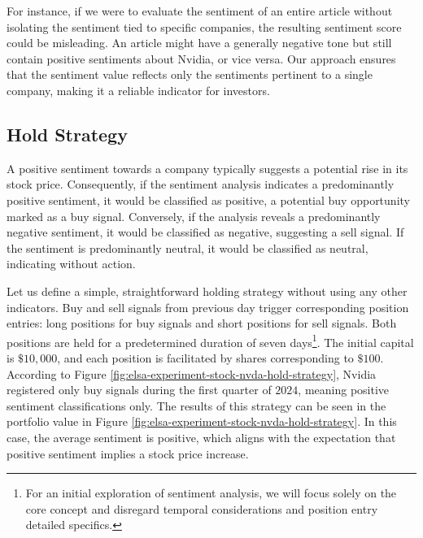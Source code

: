For instance, if we were to evaluate the sentiment of an entire article without isolating the sentiment tied to specific companies, the resulting sentiment score could be misleading. An article might have a generally negative tone but still contain positive sentiments about Nvidia, or vice versa. Our approach ensures that the sentiment value reflects only the sentiments pertinent to a single company, making it a reliable indicator for investors.

\subsection{Hold Strategy}
\label{subsec:elsa-hold-strategy}
A positive sentiment towards a company typically suggests a potential rise in its stock price. Consequently, if the sentiment analysis indicates a predominantly positive sentiment, it would be classified as positive, a potential buy opportunity marked as a buy signal. Conversely, if the analysis reveals a predominantly negative sentiment, it would be classified as negative, suggesting a sell signal. If the sentiment is predominantly neutral, it would be classified as neutral, indicating without action.

Let us define a simple, straightforward holding strategy without using any other indicators. Buy and sell signals from previous day trigger corresponding position entries: long positions for buy signals and short positions for sell signals. Both positions are held for a predetermined duration of seven days\footnote{For an initial exploration of sentiment analysis, we will focus solely on the core concept and disregard temporal considerations and position entry detailed specifics.}. The initial capital is $\$10,000$, and each position is facilitated by shares corresponding to $\$100$. According to Figure \ref{fig:elsa-experiment-stock-nvda-hold-strategy}, Nvidia registered only buy signals during the first quarter of $2024$, meaning positive sentiment classifications only. The results of this strategy can be seen in the portfolio value in Figure \ref{fig:elsa-experiment-stock-nvda-hold-strategy}. In this case, the average sentiment is positive, which aligns with the expectation that positive sentiment implies a stock price increase.

